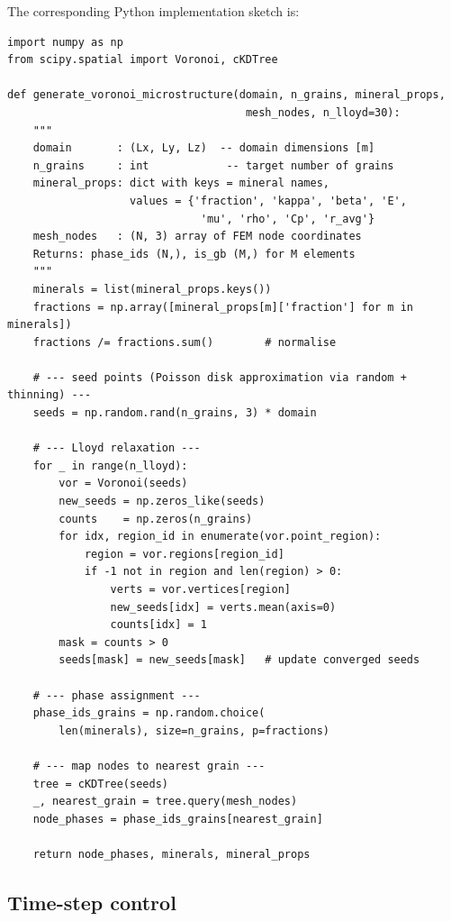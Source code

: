 \documentclass[12pt, a4paper]{article}
\begin{document}
\vspace{4pt}
The corresponding Python implementation sketch is:

\begin{lstlisting}[style=pythonstyle, caption={Voronoi microstructure generation (core routine)}, label={lst:voronoi}]
import numpy as np
from scipy.spatial import Voronoi, cKDTree

def generate_voronoi_microstructure(domain, n_grains, mineral_props,
                                     mesh_nodes, n_lloyd=30):
    """
    domain       : (Lx, Ly, Lz)  -- domain dimensions [m]
    n_grains     : int            -- target number of grains
    mineral_props: dict with keys = mineral names,
                   values = {'fraction', 'kappa', 'beta', 'E',
                              'mu', 'rho', 'Cp', 'r_avg'}
    mesh_nodes   : (N, 3) array of FEM node coordinates
    Returns: phase_ids (N,), is_gb (M,) for M elements
    """
    minerals = list(mineral_props.keys())
    fractions = np.array([mineral_props[m]['fraction'] for m in minerals])
    fractions /= fractions.sum()        # normalise

    # --- seed points (Poisson disk approximation via random + thinning) ---
    seeds = np.random.rand(n_grains, 3) * domain

    # --- Lloyd relaxation ---
    for _ in range(n_lloyd):
        vor = Voronoi(seeds)
        new_seeds = np.zeros_like(seeds)
        counts    = np.zeros(n_grains)
        for idx, region_id in enumerate(vor.point_region):
            region = vor.regions[region_id]
            if -1 not in region and len(region) > 0:
                verts = vor.vertices[region]
                new_seeds[idx] = verts.mean(axis=0)
                counts[idx] = 1
        mask = counts > 0
        seeds[mask] = new_seeds[mask]   # update converged seeds

    # --- phase assignment ---
    phase_ids_grains = np.random.choice(
        len(minerals), size=n_grains, p=fractions)

    # --- map nodes to nearest grain ---
    tree = cKDTree(seeds)
    _, nearest_grain = tree.query(mesh_nodes)
    node_phases = phase_ids_grains[nearest_grain]

    return node_phases, minerals, mineral_props
\end{lstlisting}

\subsection{Time-step control}
\end{document}

